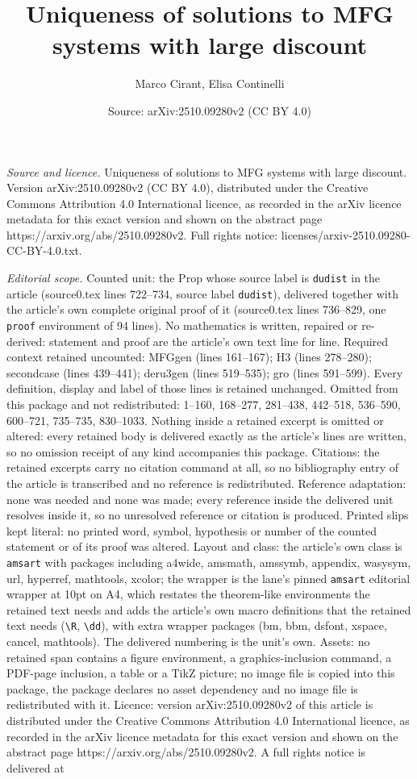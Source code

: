 \documentclass[10pt,a4paper]{amsart}
\title[Uniqueness of solutions to MFG systems with large discount]{Uniqueness of solutions to MFG systems with large discount}
\author{Marco Cirant, Elisa Continelli}
\date{Source: arXiv:2510.09280v2 (CC BY 4.0)}
\begin{document}
\maketitle

\noindent\emph{Source and licence.} Uniqueness of solutions to MFG systems with large discount. Version arXiv:2510.09280v2 (CC BY 4.0), distributed under the Creative Commons Attribution 4.0 International licence, as recorded in the arXiv licence metadata for this exact version and shown on the abstract page https://arxiv.org/abs/2510.09280v2. Full rights notice: licenses/arxiv-2510.09280-CC-BY-4.0.txt.\par\smallskip

\noindent\textit{Editorial scope.} Counted unit: the Prop whose source label is \texttt{dudist} in the article (source0.tex lines 722--734, source label \texttt{dudist}), delivered together with the article's own complete original proof of it (source0.tex lines 736--829, one \texttt{proof} environment of 94 lines). No mathematics is written, repaired or re-derived: statement and proof are the article's own text line for line. Required context retained uncounted: MFGgen (lines 161--167); H3 (lines 278--280); secondcase (lines 439--441); deru3gen (lines 519--535); gro (lines 591--599). Every definition, display and label of those lines is retained unchanged. Omitted from this package and not redistributed: 1--160, 168--277, 281--438, 442--518, 536--590, 600--721, 735--735, 830--1033. Nothing inside a retained excerpt is omitted or altered: every retained body is delivered exactly as the article's lines are written, so no omission receipt of any kind accompanies this package. Citations: the retained excerpts carry no citation command at all, so no bibliography entry of the article is transcribed and no reference is redistributed. Reference adaptation: none was needed and none was made; every reference inside the delivered unit resolves inside it, so no unresolved reference or citation is produced. Printed slips kept literal: no printed word, symbol, hypothesis or number of the counted statement or of its proof was altered. Layout and class: the article's own class is \texttt{amsart} with packages including a4wide, amsmath, amssymb, appendix, wasysym, url, hyperref, mathtools, xcolor; the wrapper is the lane's pinned \texttt{amsart} editorial wrapper at 10pt on A4, which restates the theorem-like environments the retained text needs and adds the article's own macro definitions that the retained text needs (\texttt{\textbackslash R}, \texttt{\textbackslash dd}), with extra wrapper packages (bm, bbm, dsfont, xspace, cancel, mathtools). The delivered numbering is the unit's own. Assets: no retained span contains a figure environment, a graphics-inclusion command, a PDF-page inclusion, a table or a TikZ picture; no image file is copied into this package, the package declares no asset dependency and no image file is redistributed with it. Licence: version arXiv:2510.09280v2 of this article is distributed under the Creative Commons Attribution 4.0 International licence, as recorded in the arXiv licence metadata for this exact version and shown on the abstract page https://arxiv.org/abs/2510.09280v2. A full rights notice is delivered at 
\end{document}
